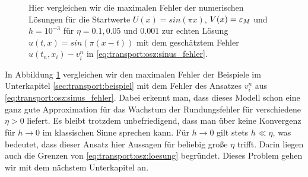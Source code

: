 \begin{figure}
\centering
{}
\caption{Hier vergleichen wir die maximalen Fehler der numerischen Lösungen für die Startwerte $U(x) = sin(\pi x)$, $V(x) = \varepsilon_M$ und $h = 10^{-3}$ für $\eta = 0.1, 0.05$ und $0.001$ zur echten Lösung $u(t,x) = sin(\pi(x - t))$ mit dem geschätztem Fehler $u(t_n, x_i) - v^n_i$ in \eqref{eq:transport:osz:sinus_fehler}.}
\label{fig:transport:osz:max_error}
\end{figure}

In Abbildung \ref{fig:transport:osz:max_error} vergleichen wir den maximalen Fehler der Beispiele im Unterkapitel \ref{sec:transport:beispiel} mit dem Fehler des Ansatzes $v^n_i$ aus \eqref{eq:transport:osz:sinus_fehler}.
Dabei erkennt man, dass dieses Modell schon eine ganz gute Approximation für das Wachstum der Rundungsfehler für verschiedene $\eta > 0$ liefert.
Es bleibt trotzdem unbefriedigend, dass man über keine Konvergenz für $h \to 0$ im klassischen Sinne sprechen kann.
Für $h \to 0$ gilt stets $h \ll \eta$, was bedeutet, dass dieser Ansatz hier Aussagen für beliebig große $\eta$ trifft.
Darin liegen auch die Grenzen von \eqref{eq:transport:osz:loesung} begründet.
Dieses Problem gehen wir mit dem nächstem Unterkapitel an.

